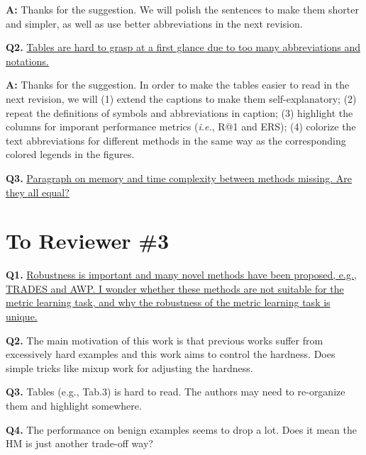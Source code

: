 \documentclass[10pt,twocolumn,letterpaper]{article}
\begin{document}
\textbf{A:} Thanks for the suggestion. We will polish the sentences to make
them shorter and simpler, as well as use better abbreviations in the next
revision.

\noindent\textbf{Q2.}
%
\ul{
Tables are hard to grasp at a first glance due to too many abbreviations and
notations.
}

\textbf{A:} Thanks for the suggestion. In order to make the tables easier to
read in the next revision, we will (1) extend the captions to make them
self-explanatory; (2) repeat the definitions of symbols and abbreviations in
caption; (3) highlight the columns for imporant performance metrics
(\emph{i.e.}, R@1 and ERS); (4) colorize the text abbreviations for different
methods in the same way as the corresponding colored legends in the figures. 

\noindent\textbf{Q3.}
%
\ul{
Paragraph on memory and time complexity between methods missing. Are they all
equal?
}

\section*{To Reviewer \#3}

\noindent\textbf{Q1.}
%
\ul{
Robustness is important and many novel methods have been proposed, e.g., TRADES and AWP. I wonder whether these methods are not suitable for the metric learning task, and why the robustness of the metric learning task is unique.
}

\noindent\textbf{Q2.}
%
The main motivation of this work is that previous works suffer from excessively hard examples and this work aims to control the hardness. Does simple tricks like mixup work for adjusting the hardness.

\noindent\textbf{Q3.}
%
Tables (e.g., Tab.3) is hard to read. The authors may need to re-organize them and highlight somewhere.

\noindent\textbf{Q4.}
%
The performance on benign examples seems to drop a lot. Does it mean the HM is just another trade-off way?

{\small


}
\end{document}
